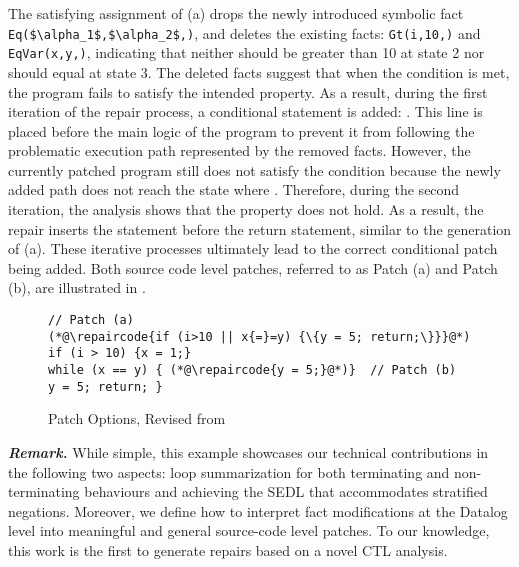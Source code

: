 The satisfying assignment of (a) drops the newly introduced symbolic fact \lstinline[mathescape]|Eq($\alpha_1$,$\alpha_2$,|\lstinline|)|, and deletes the existing facts: \lstinline|Gt(i,10,|\lstinline|)| and \lstinline|EqVar(x,y,|\lstinline|)|, 
indicating that neither should  be greater than 10 at state 2 nor should  equal  at state 3. 
The deleted facts suggest that when the condition  is met, the program fails to satisfy the intended property. As a result, during the first iteration of the repair process, a conditional statement is added: . This line is placed before the main logic of the program to prevent it from following the problematic execution path represented by the removed facts. 
However, the currently patched program still does not satisfy the condition  because the newly added path does not reach the state where . Therefore, during the second iteration, the analysis shows that the property does not hold. As a result, the repair inserts the statement  before the return statement, similar to the generation of (a).  
These iterative processes ultimately lead to the correct conditional patch being added. Both source code level patches, referred to as Patch (a) and Patch (b), are illustrated in .  


\begin{figure}[!h]
\vspace{-2mm}
\begin{lstlisting}[firstnumber=4, xleftmargin=5em,numbersep=10pt,basicstyle=\footnotesize\ttfamily]
// Patch (a) 
(*@\repaircode{if (i>10 || x{=}=y) {\{y = 5; return;\}}}@*) 
if (i > 10) {x = 1;}
while (x == y) { (*@\repaircode{y = 5;}@*)}  // Patch (b)
y = 5; return; }
\end{lstlisting} 
\caption{Patch Options, Revised from }
\label{fig:Patched-program}
\end{figure}



\noindent
{\bf \em Remark.} While simple, this example showcases our technical contributions in the following two aspects: loop summarization for both terminating and non-terminating behaviours and achieving the SEDL that accommodates stratified negations. 
Moreover, we define how to interpret fact modifications at the Datalog level into meaningful and general source-code level patches. 
To our knowledge, this work is the first to generate repairs based on a novel CTL analysis. 
